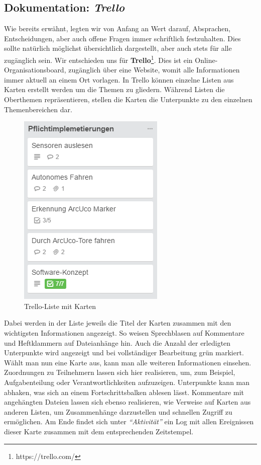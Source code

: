 \subsection{Dokumentation: \textit{Trello}}
Wie bereits erwähnt, legten wir von Anfang an Wert darauf, Absprachen, Entscheidungen, aber auch offene Fragen immer schriftlich festzuhalten. Dies sollte natürlich möglichst übersichtlich dargestellt, aber auch stets für alle zugänglich sein. Wir entschieden uns für \textbf{Trello}\footnote[1]{https://trello.com/}. Dies ist ein Online-Organisationsboard, zugänglich über eine Website, womit alle Informationen immer aktuell an einem Ort vorlagen. In Trello können einzelne Listen aus Karten erstellt werden um die Themen zu gliedern. Während Listen die Oberthemen repräsentieren, stellen die Karten die Unterpunkte zu den einzelnen Themenbereichen dar.
\begin{figure}[hp] 
  \centering
     \includegraphics{images/PflichtimplementierungenListe.PNG}
  \caption{Trello-Liste mit Karten}
  \label{fig:Trello-Liste}
\end{figure}
\newline
Dabei werden in der Liste jeweils die Titel der Karten zusammen mit den wichtigsten Informationen angezeigt. So weisen Sprechblasen auf Kommentare und Heftklammern auf Dateianhänge hin. Auch die Anzahl der erledigten Unterpunkte wird angezeigt und bei vollständiger Bearbeitung grün markiert.
\pagebreak \newline
Wählt man nun eine Karte aus, kann man alle weiteren Informationen einsehen. Zuordnungen zu Teilnehmern lassen sich hier realisieren, um, zum Beispiel, Aufgabenteilung oder Verantwortlichkeiten aufzuzeigen. Unterpunkte kann man abhaken, was sich an einem Fortschrittsbalken ablesen lässt. Kommentare mit angehängten Dateien lassen sich ebenso realisieren, wie Verweise auf Karten aus anderen Listen, um Zusammenhänge darzustellen und schnellen Zugriff zu ermöglichen. Am Ende findet sich unter \textit{"`Aktivität"'} ein Log mit allen Ereignissen dieser Karte zusammen mit dem entsprechenden Zeitstempel.

